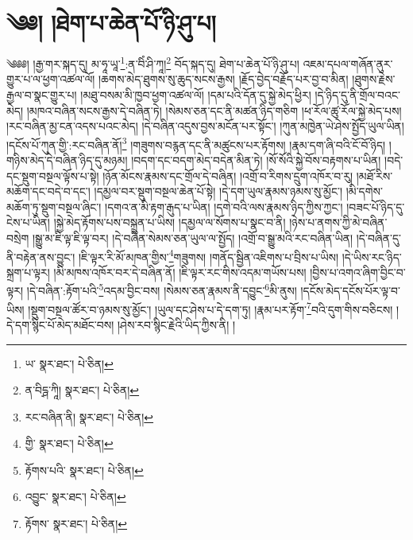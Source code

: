\setcounter{footnote}{0} 
\chapter{༄༅། །ཐེག་པ་ཆེན་པོ་ཉི་ཤུ་པ།}༄༅༅། །རྒྱ་གར་སྐད་དུ། མ་ཧཱ་ཡཱ་\footnote{ཡ་  སྣར་ཐང་།  པེ་ཅིན། }:ན་བིཾ་ཤི་ཀཱ།\footnote{ན་བིདྴ་ཀཱི།  སྣར་ཐང་།  པེ་ཅིན། } བོད་སྐད་དུ། ཐེག་པ་ཆེན་པོ་ཉི་ཤུ་པ། འཇམ་དཔལ་གཞོན་ནུར་གྱུར་པ་ལ་ཕྱག་འཚལ་ལོ། །ཆགས་མེད་ཐུགས་སུ་ཆུད་སངས་རྒྱས། །རྗོད་བྱེད་བརྗོད་པར་བྱ་བ་མིན། །ཐུགས་རྗེས་རྒྱལ་བ་སྣང་གྱུར་པ། །མཐུ་བསམ་མི་ཁྱབ་ཕྱག་འཚལ་ལོ། །དམ་པའི་དོན་དུ་སྐྱེ་མེད་ཕྱིར། །དེ་ཉིད་དུ་ནི་གྲོལ་བའང་མེད། །མཁའ་བཞིན་སངས་རྒྱས་དེ་བཞིན་ཏེ། །སེམས་ཅན་དང་ནི་མཚན་ཉིད་གཅིག །ཕ་རོལ་ཚུ་རོལ་སྐྱེ་མེད་པས། །རང་བཞིན་མྱ་ངན་འདས་པའང་མེད། །དེ་བཞིན་འདུས་བྱས་མངོན་པར་སྟོང་། །ཀུན་མཁྱེན་ཡེ་ཤེས་སྤྱོད་ཡུལ་ཡིན། །དངོས་པོ་ཀུན་གྱི་:རང་བཞིན་ནོ།\footnote{རང་བཞིན་ནི།  སྣར་ཐང་།  པེ་ཅིན། } །གཟུགས་བརྙན་དང་ནི་མཚུངས་པར་རྟོགས། །རྣམ་དག་ཞི་བའི་ངོ་བོ་ཉིད། །གཉིས་མེད་དེ་བཞིན་ཉིད་དུ་མཉམ། །བདག་དང་བདག་མེད་བདེན་མིན་ཏེ། །སོ་སོའི་སྐྱེ་བོས་བརྟགས་པ་ཡིན། །བདེ་དང་སྡུག་བསྔལ་ལྟོས་པ་སྟེ། །ཉོན་མོངས་རྣམས་དང་གྲོལ་དེ་བཞིན། །འགྲོ་བ་རིགས་དྲུག་འཁོར་བ་རུ། །མཐོ་རིས་མཆོག་དང་བདེ་བ་དང་། །དམྱལ་བར་སྡུག་བསྔལ་ཆེན་པོ་སྟེ། །དེ་དག་ཡུལ་རྣམས་ཉམས་སུ་མྱོང་། །མི་དགེས་མཆོག་ཏུ་སྡུག་བསྔལ་ཞིང་། །དགའ་ན་མི་རྟག་རྒུད་པ་ཡིན། །དགེ་བའི་ལས་རྣམས་ཉིད་ཀྱིས་ཀྱང་། །བཟང་པོ་ཉིད་དུ་ངེས་པ་ཡིན། །སྐྱེ་མེད་རྟོགས་པས་བསྐྲུན་པ་ཡིས། །དམྱལ་ལ་སོགས་པ་སྣང་བ་ནི། །ཉེས་པ་ནགས་ཀྱི་མེ་བཞིན་བསྲེག །སྒྱུ་མ་ཇི་ལྟ་ཇི་ལྟ་བར། །དེ་བཞིན་སེམས་ཅན་ཡུལ་ལ་སྤྱོད། །འགྲོ་བ་སྒྱུ་མའི་རང་བཞིན་ཡིན། །དེ་བཞིན་དུ་ནི་བརྟེན་ནས་བྱུང་། །ཇི་ལྟར་རི་མོ་མཁན་གྱིས་\footnote{གྱི་  སྣར་ཐང་།  པེ་ཅིན། }གཟུགས། །གནོད་སྦྱིན་འཇིགས་པ་བྲིས་པ་ཡིས། །དེ་ཡིས་རང་ཉིད་སྐྲག་པ་ལྟར། །མི་མཁས་འཁོར་བར་དེ་བཞིན་ནོ། །ཇི་ལྟར་རང་གིས་འདམ་གཡོས་པས། །བྱིས་པ་འགའ་ཞིག་བྱིང་བ་ལྟར། །དེ་བཞིན་:རྟོག་པའི་\footnote{རྟོགས་པའི་  སྣར་ཐང་།  པེ་ཅིན། }འདམ་བྱིང་བས། །སེམས་ཅན་རྣམས་ནི་དབྱུང་\footnote{འབྱུང་  སྣར་ཐང་།  པེ་ཅིན། }མི་ནུས། །དངོས་མེད་དངོས་པོར་ལྟ་བ་ཡིས། །སྡུག་བསྔལ་ཚོར་བ་ཉམས་སུ་མྱོང་། །ཡུལ་དང་ཤེས་པ་དེ་དག་ཏུ། །རྣམ་པར་རྟོག་\footnote{རྟོགས་  སྣར་ཐང་།  པེ་ཅིན། }བའི་དུག་གིས་བཅིངས། །དེ་དག་སྙིང་པོ་མེད་མཐོང་བས། །ཤེས་རབ་སྙིང་རྗེའི་ཡིད་ཀྱིས་ནི། །
